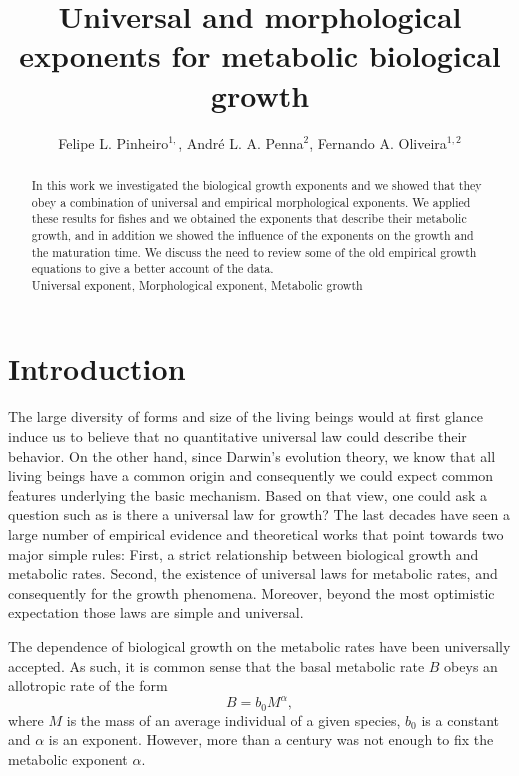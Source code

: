 \documentclass[12pt]{iopart}
\begin{document}
\title{Universal and morphological exponents for metabolic biological growth}
	\author{Felipe L. Pinheiro$^{1,}$, Andr\'{e} L. A. Penna$^2$, Fernando A. Oliveira$^{1,2}$}
	\address{
	$^1$ Instituto de F\'{i}sica, Universidade de Bras\'{i}lia, Brazil
}
	\address{
	$^2$ International Center for Condensed Matter Physics, Universidade de Bras\'{i}lia, Brazil
}



\begin{abstract}
In this work we investigated the biological growth exponents and we showed that they obey a combination of universal and empirical morphological exponents.  We applied these results for fishes and we obtained the exponents that describe their metabolic growth, and in addition we showed the influence of the exponents on the growth and the maturation time. We discuss the need to review some of the old empirical growth equations to give a better account of the data.\\
 Universal exponent, Morphological exponent, Metabolic growth
\end{abstract}

\section{Introduction}
\label{intro}
The large diversity of forms and size of the living beings would at first glance induce us to believe that  no quantitative universal law could describe their behavior.  On the other  hand, since Darwin's evolution theory, we know that all living beings have a common origin and consequently we could expect common features underlying the basic mechanism. Based on that view, one could ask a question such as is there a universal law for growth? The last decades have seen a large number of  empirical evidence  and theoretical works that point towards two major simple rules:  First, a strict relationship between biological growth and  metabolic rates. Second, the existence of universal laws for metabolic rates, and consequently for the growth phenomena. Moreover, beyond the most optimistic expectation those laws are simple and universal.

The dependence of biological growth on the metabolic rates have been universally accepted. As such, it is common sense that the basal metabolic rate $B$ obeys an allotropic rate of the form \cite{Bertalanffy38a,Bertalanffy57,West97,West99,Brown05,Hatton15,Cebrian16,Rubner1883,Kleiber32,Banavar10,Agutter11}
\begin{equation}
B = b_0M^{\alpha},
\end{equation}
where $M$ is the mass of an average individual of a given species, $b_0$ is a constant and $\alpha$ is an exponent. However, more than a century was not enough to fix the  metabolic exponent $\alpha$.
\end{document}

